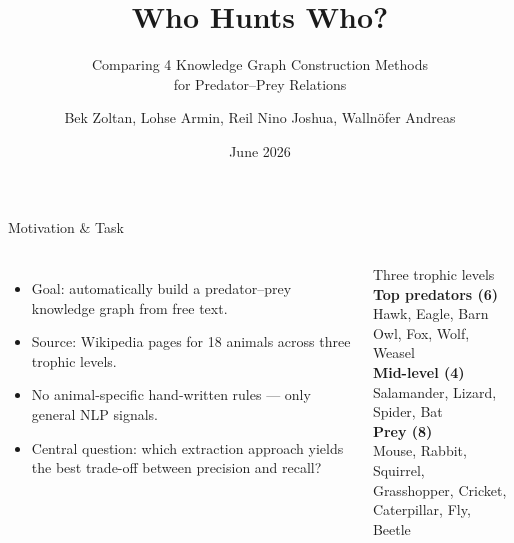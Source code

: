 \documentclass[aspectratio=169,11pt]{beamer}
\title{Who Hunts Who?}
\subtitle{Comparing 4 Knowledge Graph Construction Methods\\for Predator–Prey Relations}
\author{Bek Zoltan, Lohse Armin, Reil Nino Joshua, Wallnöfer Andreas}
\institute{Natural Language Processing}
\date{June 2026}
\begin{document}

\begin{frame}[plain]
  \titlepage
\end{frame}


\begin{frame}{Motivation \& Task}
  \begin{columns}[T,totalwidth=\textwidth]
      \begin{itemize}
        \item Goal: automatically build a \alert{predator--prey knowledge graph} from free text.
        \item Source: Wikipedia pages for 18 animals across three trophic levels.
        \item No animal-specific hand-written rules --- only general NLP signals.
        \item Central question: \alert{which extraction approach yields the best trade-off between precision and recall?}
      \end{itemize}
      \begin{block}{Three trophic levels}
        \small
        \textbf{\textcolor{td3red}{Top predators (6)}} \\
        Hawk, Eagle, Barn Owl, Fox, Wolf, Weasel \\[0.45em]
        \textbf{\textcolor{td3gold}{Mid-level (4)}} \\
        Salamander, Lizard, Spider, Bat \\[0.45em]
        \textbf{\textcolor{td3green}{Prey (8)}} \\
        Mouse, Rabbit, Squirrel,\\
        Grasshopper, Cricket,\\
        Caterpillar, Fly, Beetle
      \end{block}
  \end{columns}
\end{frame}
\end{document}
